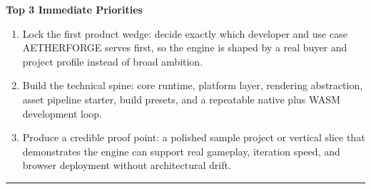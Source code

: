 \documentclass[10pt]{article}
\begin{document}
\textbf{Top 3 Immediate Priorities}
\begin{enumerate}
    \item Lock the first product wedge: decide exactly which developer and use case AETHERFORGE serves first, so the engine is shaped by a real buyer and project profile instead of broad ambition.
    \item Build the technical spine: core runtime, platform layer, rendering abstraction, asset pipeline starter, build presets, and a repeatable native plus WASM development loop.
    \item Produce a credible proof point: a polished sample project or vertical slice that demonstrates the engine can support real gameplay, iteration speed, and browser deployment without architectural drift.
\end{enumerate}

\vspace{1pt}
\hrule
\vspace{4pt}
\end{document}
